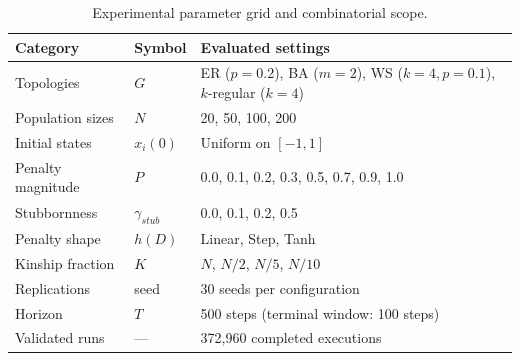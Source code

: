 \begin{table}[htbp]
  \centering
  \caption{Experimental parameter grid and combinatorial scope.}
  \label{tab:parameter-grid}
  \begin{tabular}{lll}
    \toprule
    Category & Symbol & Evaluated settings \\
    \midrule
    Topologies & $G$ & ER ($p=0.2$), BA ($m=2$), WS ($k=4,p=0.1$), $k$-regular ($k=4$) \\
    Population sizes & $N$ & 20, 50, 100, 200 \\
    Initial states & $x_i(0)$ & Uniform on $[-1,1]$ \\
    Penalty magnitude & $P$ & 0.0, 0.1, 0.2, 0.3, 0.5, 0.7, 0.9, 1.0 \\
    Stubbornness & $\gamma_{stub}$ & 0.0, 0.1, 0.2, 0.5 \\
    Penalty shape & $h(D)$ & Linear, Step, Tanh \\
    Kinship fraction & $K$ & $N$, $N/2$, $N/5$, $N/10$ \\
    Replications & seed & 30 seeds per configuration \\
    Horizon & $T$ & 500 steps (terminal window: 100 steps) \\
    Validated runs & --- & 372{,}960 completed executions \\
    \bottomrule
  \end{tabular}
\end{table}
